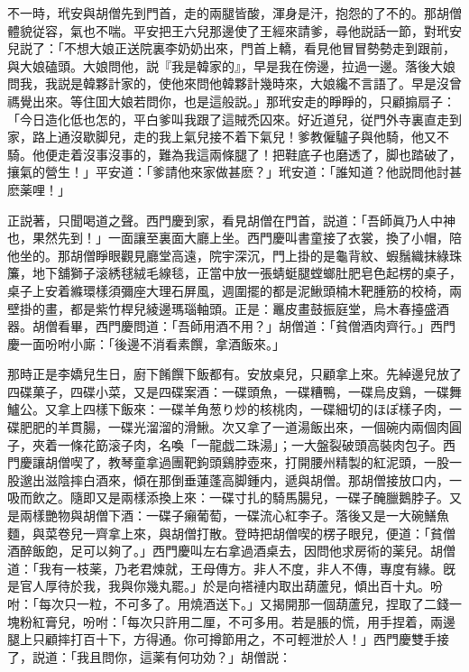 不一時，玳安與胡僧先到門首，走的兩腿皆酸，渾身是汗，抱怨的了不的。那胡僧體貌従容，氣也不喘。平安把王六兒那邊使了王經來請爹，尋他説話一節，對玳安兒説了：「不想大娘正送院裏李奶奶出來，門首上轎，看見他冒冒勢勢走到跟前，與大娘磕頭。大娘問他，説『我是韓家的』，早是我在傍邊，拉過一邊。落後大娘問我，我説是韓夥計家的，使他來問他韓夥計幾時來，大娘纔不言語了。早是沒曾禡覺出來。等住囬大娘若問你，也是這般説。」那玳安走的睜睜的，只顧搧扇子：「今日造化低也怎的，平白爹叫我跟了這賊禿囚來。好近道兒，従門外寺裏直走到家，路上通沒歇脚兒，走的我上氣兒接不着下氣兒！爹教僱驢子與他騎，他又不騎。他便走着沒事沒事的，難為我這兩條腿了！把鞋底子也磨透了，脚也踏破了，攘氣的營生！」平安道：「爹請他來家做甚麽？」玳安道：「誰知道？他説問他討甚麽薬哩！」

正説著，只聞喝道之聲。西門慶到家，看見胡僧在門首，説道：「吾師眞乃人中神也，果然先到！」一面讓至裏面大廳上坐。西門慶叫書童接了衣裳，換了小帽，陪他坐的。那胡僧睜眼觀見廳堂高遠，院宇深沉，門上掛的是龜背紋、蝦鬚織抹綠珠簾，地下舖獅子滚綉毬絨毛線毯，正當中放一張蜻蜓腿螳螂肚肥皂色起楞的桌子，桌子上安着縧環樣須彌座大理石屏風，週圍擺的都是泥鰍頭楠木靶腫筋的校椅，兩壁掛的畫，都是紫竹桿兒綾邊瑪瑙軸頭。正是：鼉皮畫鼓振庭堂，烏木春擡盛酒器。胡僧看畢，西門慶問道：「吾師用酒不用？」胡僧道：「貧僧酒肉齊行。」西門慶一面吩咐小廝：「後邊不消看素饌，拿酒飯來。」

那時正是李嬌兒生日，廚下餚饌下飯都有。安放桌兒，只顧拿上來。先綽邊兒放了四碟菓子，四碟小菜，又是四碟案酒：一碟頭魚，一碟糟鴨，一碟烏皮鷄，一碟舞鱸公。又拿上四樣下飯來：一碟羊角葱り炒的核桃肉，一碟細切的ほぽ樣子肉，一碟肥肥的羊貫腸，一碟光溜溜的滑鰍。次又拿了一道湯飯出來，一個碗内兩個肉圓子，夾着一條花筯滚子肉，名喚「一龍戯二珠湯」；一大盤裂破頭高裝肉包子。西門慶讓胡僧喫了，教琴童拿過團靶鉤頭鷄脖壺來，打開腰州精製的紅泥頭，一股一股邈出滋陰摔白酒來，傾在那倒垂蓮蓬高脚鍾内，遞與胡僧。那胡僧接放口内，一吸而飲之。隨即又是兩樣添換上來：一碟寸扎的騎馬腸兒，一碟子醃臘鵝脖子。又是兩樣艷物與胡僧下酒：一碟子癩葡萄，一碟流心紅李子。落後又是一大碗鱔魚麵，與菜卷兒一齊拿上來，與胡僧打散。登時把胡僧喫的楞子眼兒，便道：「貧僧酒醉飯飽，足可以夠了。」西門慶叫左右拿過酒桌去，因問他求房術的薬兒。胡僧道：「我有一枝薬，乃老君煉就，王母傳方。非人不度，非人不傳，專度有緣。旣是官人厚待於我，我與你幾丸罷。」於是向褡褳内取出葫蘆兒，傾出百十丸。吩咐：「每次只一粒，不可多了。用燒酒送下。」又揭開那一個葫蘆兒，捏取了二錢一塊粉紅膏兒，吩咐：「每次只許用二厘，不可多用。若是脹的慌，用手捏着，兩邊腿上只顧摔打百十下，方得通。你可撙節用之，不可輕泄於人！」西門慶雙手接了，説道：「我且問你，這薬有何功効？」胡僧説：

